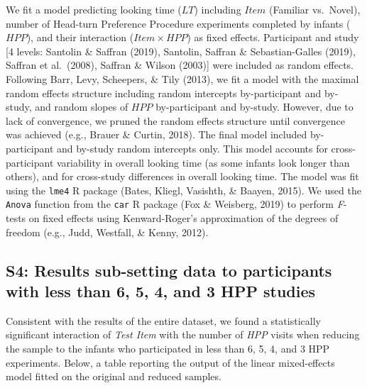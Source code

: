 \documentclass[
  english,
  man,man,floatsintext]{apa6}
\begin{document}
\begin{appendix}
We fit a model predicting looking time (\(LT\)) including \(Item\)
(Familiar vs.~Novel), number of Head-turn Preference Procedure
experiments completed by infants (\(HPP\)), and their interaction
(\(Item \times HPP\)) as fixed effects. Participant and study {[}4
levels: Santolin \& Saffran (2019), Santolin, Saffran \&
Sebastian-Galles (2019), Saffran et al.~(2008), Saffran \& Wilson
(2003){]} were included as random effects. Following Barr, Levy,
Scheepers, \& Tily (2013), we fit a model with the maximal random
effects structure including random intercepts by-participant and
by-study, and random slopes of \(HPP\) by-participant and by-study.
However, due to lack of convergence, we pruned the random effects
structure until convergence was achieved (e.g., Brauer \& Curtin, 2018).
The final model included by-participant and by-study random intercepts
only. This model accounts for cross-participant variability in overall
looking time (as some infants look longer than others), and for
cross-study differences in overall looking time. The model was fit using
the \texttt{lme4} R package (Bates, Kliegl, Vasishth, \& Baayen, 2015).
We used the \texttt{Anova} function from the \texttt{car} R package (Fox
\& Weisberg, 2019) to perform \emph{F}-tests on fixed effects using
Kenward-Roger's approximation of the degrees of freedom (e.g., Judd,
Westfall, \& Kenny, 2012).

\hypertarget{s4}{%
\subsection{S4: Results sub-setting data to participants with less than
6, 5, 4, and 3 HPP studies}\label{s4}}

Consistent with the results of the entire dataset, we found a
statistically significant interaction of \emph{Test Item} with the
number of \emph{HPP} visits when reducing the sample to the infants who
participated in less than 6, 5, 4, and 3 HPP experiments. Below, a table
reporting the output of the linear mixed-effects model fitted on the
original and reduced samples.


\end{appendix}
\end{document}

